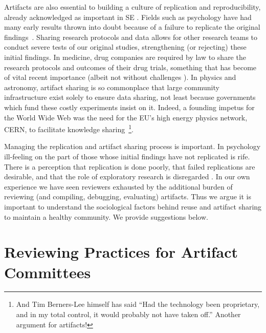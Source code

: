 \documentclass[smallextended]{svjour3}       %
\begin{document}
Artifacts are also essential to building a culture of replication and reproducibility, already acknowledged as important in SE \cite{2020arXiv201102861S}. Fields such as psychology have had many early results thrown into doubt because of a failure to replicate the original findings~\cite{Schimmack2020}. Sharing research protocols and data allows for other research teams to conduct severe tests of our original studies, strengthening (or rejecting) these initial findings. In medicine, drug companies are required by law to share the research protocols and outcomes of their drug trials, something that has become of vital recent importance (albeit not without challenges \cite{DeVito2020}). In physics and astronomy, artifact sharing is so commonplace that large community infrastructure exist solely to ensure data sharing, not least because governments which fund these costly experiments insist on it. Indeed, a founding impetus for the World Wide Web was the need for the EU's high energy physics network, CERN, to facilitate knowledge sharing~\cite{tbl90}\footnote{And Tim Berners-Lee himself has said ``Had the technology been proprietary, and in my total control, it would probably not have taken off.'' Another argument for artifacts!}.

Managing the replication and artifact sharing process is important. In psychology ill-feeling on the part of those whose initial findings have not replicated is rife. There is a perception that replication is done poorly, that failed replications are desirable, and that the role of exploratory research is disregarded \cite{Schimmack2020}. In our own experience we have seen reviewers exhausted by the additional burden of reviewing (and compiling, debugging, evaluating) artifacts. Thus we argue it is important to understand the sociological factors behind reuse and artifact sharing to maintain a healthy community. We provide suggestions below.


\section{Reviewing Practices for Artifact Committees}
\end{document}
